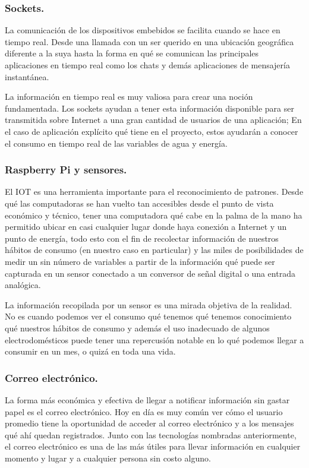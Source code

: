 \documentclass[a4paper,man,natbib]{apa6}
\begin{document}
\subsubsection{Sockets.}
La comunicación de los dispositivos embebidos se facilita cuando se hace en tiempo real. Desde una llamada con un ser querido en una ubicación geográfica diferente a la suya hasta la forma en qué se comunican las principales aplicaciones en tiempo real como los chats y demás aplicaciones de mensajería instantánea.
\newline

La información en tiempo real es muy valiosa para crear una noción fundamentada. Los sockets ayudan a tener esta información disponible para ser transmitida sobre Internet a una gran cantidad de usuarios de una aplicación; En el caso de aplicación explícito qué tiene en el proyecto, estos ayudarán a conocer el consumo en tiempo real de las variables de agua y energía.\newline

\subsubsection{Raspberry Pi y sensores.}
El IOT es una herramienta importante para el reconocimiento de patrones. Desde qué las computadoras se han vuelto tan accesibles desde el punto de vista económico y técnico, tener una computadora qué cabe en la palma de la mano ha permitido ubicar en casi cualquier lugar donde haya conexión a Internet y un punto de energía, todo esto con el fin de recolectar información de nuestros hábitos de consumo (en nuestro caso en particular) y las miles de posibilidades de medir un sin número de variables a partir de la información qué puede ser capturada en un sensor conectado a un conversor de señal digital o una entrada analógica.
\newline

La información recopilada por un sensor es una mirada objetiva de la realidad. No es cuando podemos ver el consumo qué tenemos qué tenemos conocimiento qué nuestros hábitos de consumo y además el uso inadecuado de algunos electrodomésticos puede tener una repercusión notable en lo qué podemos llegar a consumir en un mes, o quizá en toda una vida.\newline

\subsubsection{Correo electrónico.}
La forma más económica y efectiva de llegar a notificar información sin gastar papel es el correo electrónico. Hoy en día es muy común ver cómo el usuario promedio tiene la oportunidad de acceder al correo electrónico y a los mensajes qué ahí quedan registrados. Junto con las tecnologías nombradas anteriormente, el correo electrónico es una de las más útiles para llevar información en cualquier momento y lugar y a cualquier persona sin costo alguno.
\end{document}
